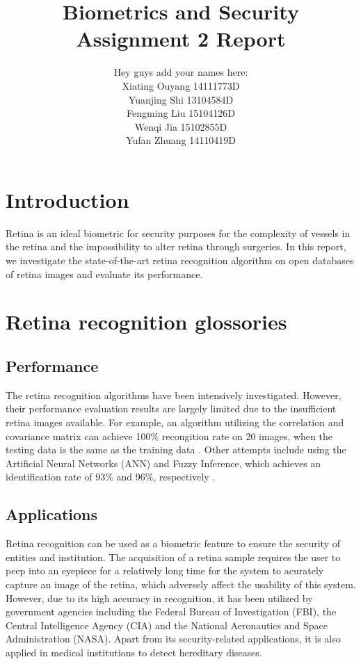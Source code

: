 \documentclass[a4paper,11pt]{article}
\title{\vspace{-2cm}Biometrics and Security \\ Assignment 2 Report}
\author{Hey guys add your names here: \\
	Xiating Ouyang 14111773D \\
	Yuanjing Shi 13104584D \\
	Fengming Liu 15104126D \\
	Wenqi Jia 15102855D \\
	Yufan Zhuang 14110419D \\
	}
\date{}
\theoremstyle{plain} %
\begin{document}
\maketitle	

\section{Introduction}
Retina is an ideal biometric for security purposes for the complexity of vessels in the retina and the impossibility to alter retina through surgeries. In this report, we investigate the state-of-the-art retina recognition algorithm on open databases of retina images and evaluate its performance.

\section{Retina recognition glossories}

\subsection{Performance}
The retina recognition algorithms have been intensively investigated. However, their performance evaluation results are largely limited due to the insufficient retina images available. For example, an algorithm utilizing the correlation and covariance matrix can achieve 100\% recongition rate on 20 images, when the testing data is the same as the training data \cite{kakarwal2010analysis}. Other attempts include using the Artificial Neural Networks (ANN) and Fuzzy Inference, which achieves an identification rate of 93\% and 96\%, respectively \cite{borah2015retina}.


\subsection{Applications}
Retina recognition can be used as a biometric feature to ensure the security of entities and institution. The acquisition of a retina sample requires the user to peep into an eyepiece for a relatively long time for the system to acurately capture an image of the retina, which adversely affect the usability of this system. However, due to its high accuracy in recognition, it has been utilized by government agencies including the Federal Bureau of Investigation (FBI), the Central Intelligence Agency (CIA) and the National Aeronautics and Space Administration (NASA). Apart from its security-related applications, it is also applied in medical institutions to detect hereditary diseases.
\end{document}
